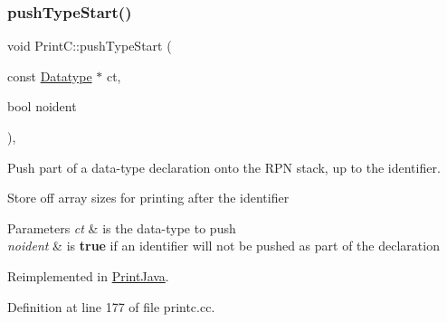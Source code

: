 \subsubsection{\texorpdfstring{pushTypeStart()}{pushTypeStart()}}
{\footnotesize\ttfamily void Print\+C\+::push\+Type\+Start (\begin{DoxyParamCaption}\item[{const \mbox{\hyperlink{class_datatype}{Datatype}} $\ast$}]{ct,  }\item[{bool}]{noident }\end{DoxyParamCaption})\hspace{0.3cm}{\ttfamily [protected]}, {\ttfamily [virtual]}}



Push part of a data-\/type declaration onto the R\+PN stack, up to the identifier. 

Store off array sizes for printing after the identifier 
\begin{DoxyParams}{Parameters}
{\em ct} & is the data-\/type to push \\
\hline
{\em noident} & is {\bfseries{true}} if an identifier will not be pushed as part of the declaration \\
\hline
\end{DoxyParams}


Reimplemented in \mbox{\hyperlink{class_print_java_af82e5ca143891ea052778b1ed234d3e0}{Print\+Java}}.



Definition at line 177 of file printc.\+cc.

